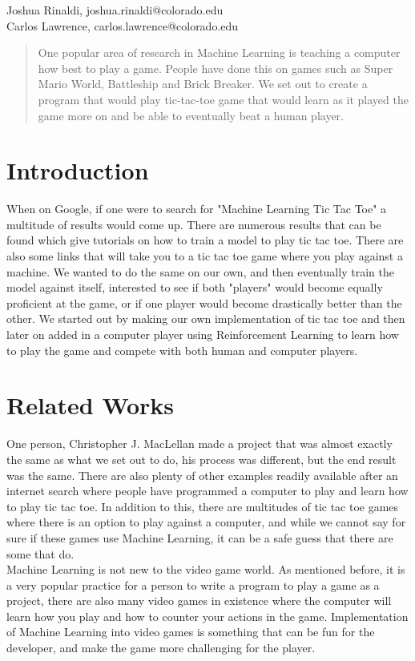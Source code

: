 \documentclass{article}
\begin{document}

\begin{center}
Joshua Rinaldi, joshua.rinaldi@colorado.edu\\
Carlos Lawrence, carlos.lawrence@colorado.edu
\end{center} 
\vskip 0.3in

\begin{abstract}
One popular area of research in Machine Learning is teaching a computer how best to play a game. People have done this on games such as Super Mario World, Battleship and Brick Breaker. We set out to create a program that would play tic-tac-toe game that would learn as it played the game more on and be able to eventually beat a human player.
\end{abstract}

\section{Introduction}
When on Google, if one were to search for "Machine Learning Tic Tac Toe" a multitude of results would come up. There are numerous results that can be found which give tutorials on how to train a model to play tic tac toe. There are also some links that will take you to a tic tac toe game where you play against a machine. We wanted to do the same on our own, and then eventually train the model against itself, interested to see if both "players" would become equally proficient at the game, or if one player would become drastically better than the other. We started out by making our own implementation of tic tac toe and then later on added in a computer player using Reinforcement Learning to learn how to play the game and compete with both human and computer players.

\section{Related Works}
One person, Christopher J. MacLellan made a project that was almost exactly the same as what we set out to do, his process was different, but the end result was the same. There are also plenty of other examples readily available after an internet search where people have programmed a computer to play and learn how to play tic tac toe. In addition to this, there are multitudes of tic tac toe games where there is an option to play against a computer, and while we cannot say for sure if these games use Machine Learning, it can be a safe guess that there are some that do. \\
Machine Learning is not new to the video game world. As mentioned before, it is a very popular practice for a person to write a program to play a game as a project, there are also many video games in existence where the computer will learn how you play and how to counter your actions in the game. Implementation of Machine Learning into video games is something that can be fun for the developer, and make the game more challenging for the player.
\end{document}
